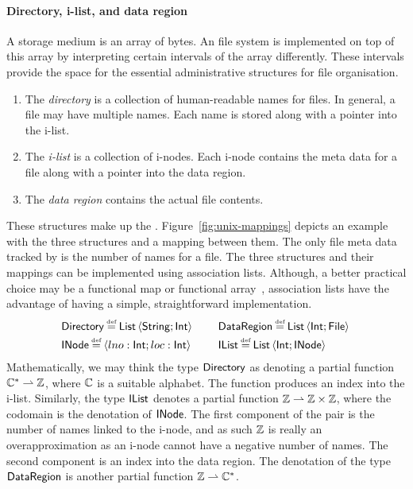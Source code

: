 \documentclass[12pt,phd,lfcs,twoside,openright,logo,leftchapter,normalheadings]{infthesis}
\theoremstyle{plain}
\theoremstyle{definition}
\begin{document}
\paragraph{Directory, i-list, and data region}
%
A storage medium is an array of bytes. An \UNIX{} file system is
implemented on top of this array by interpreting certain intervals of
the array differently. These intervals provide the space for the
essential administrative structures for file organisation.
%
\begin{enumerate}
  \item The \emph{directory} is a collection of human-readable names for
  files. In general, a file may have multiple names. Each name is
  stored along with a pointer into the i-list.
  \item The \emph{i-list} is a collection of i-nodes. Each i-node
  contains the meta data for a file along with a pointer into the data
  region.
  \item The \emph{data region} contains the actual file contents.
\end{enumerate}
%
These structures make up the \fsname{}.
%
Figure~\ref{fig:unix-mappings} depicts an example with the three
structures and a mapping between them.
%
The only file meta data tracked by \fsname{} is the number of names for
a file.
%
The three structures and their mappings can be implemented using
association lists. Although, a better practical choice may be a
functional map or functional array~\cite{Okasaki99}, association lists
have the advantage of having a simple, straightforward implementation.
%
\[
  \ba{@{~}l@{\qquad}c@{~}l}
    \Directory \defas \List\,\Record{\String;\Int} &&%
    \DataRegion \defas \List\,\Record{\Int;\UFile} \smallskip\\
    \INode \defas \Record{lno:\Int;loc:\Int}  &&%
    \IList \defas \List\,\Record{\Int;\INode}
  \ea
\]
%
Mathematically, we may think the type $\mathsf{Directory}$ as denoting a
partial function $\mathbb{C}^\ast \rightharpoonup \mathbb{Z}$, where $\mathbb{C}$ is a suitable
alphabet. The function produces an index into the i-list.
%
Similarly, the type $\mathsf{IList}$ denotes a partial function
$\mathbb{Z} \rightharpoonup \mathbb{Z} \times \mathbb{Z}$, where the codomain is the denotation of
$\mathsf{INode}$. The first component of the pair is the number of names
linked to the i-node, and as such $\mathbb{Z}$ is really an overapproximation
as an i-node cannot have a negative number of names. The second
component is an index into the data region.
%
The denotation of the type $\mathsf{DataRegion}$ is another partial
function $\mathbb{Z} \rightharpoonup \mathbb{C}^\ast$.
\end{document}
